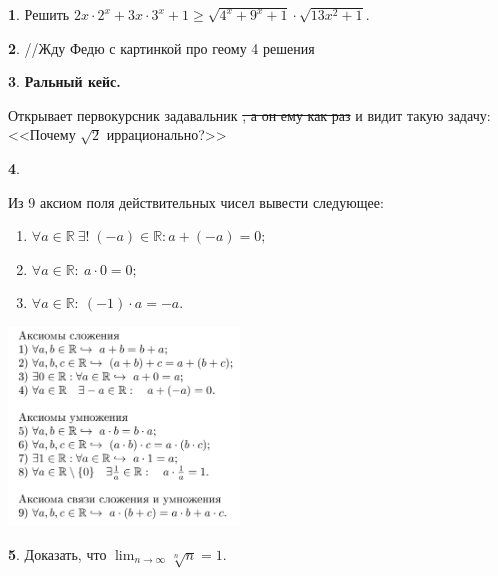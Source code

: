 \documentclass[14pt, a4paper]{extarticle}
\theoremstyle{definition}
\newtheorem{problem}{}
\theoremstyle{definition}
\theoremstyle{remark}
\numberwithin{equation}{section}
\newcommand{\R}{\ensuremath{\mathbb{R}}}
\begin{document}
\begin{problem}
    Решить $2x \cdot 2^x + 3x \cdot 3^x + 1 \geqslant 
    \sqrt{4^x + 9^x +1} \cdot \sqrt{13x^2 + 1}.$
\end{problem}

\begin{problem}
    //Жду Федю с картинкой про геому 4 решения
\end{problem}

\begin{problem}
    \textbf{Ральный кейс.}

    Открывает первокурсник задавальник \sout{, а он ему как раз}
    и видит такую задачу: <<Почему $\sqrt{2}$ иррационально?>>
\end{problem}

\begin{problem}
    \begin{multicols}{2}
        Из 9 аксиом поля действительных чисел вывести следующее:
        \renewcommand{\labelenumi}{\alph{enumi})}
        \begin{enumerate}
        \item $\forall a \in \R \ \exists ! \; (-a)\in \R : a + (-a) = 0;$
        
        \item $\forall a \in \R : \ a \cdot 0 = 0;$
        
        \item $\forall a \in \R : \ (-1) \cdot a = -a.$
        \end{enumerate}

        \columnbreak

        \includegraphics[width=0.46\textwidth]{ax.jpeg}
      \end{multicols}
\end{problem}

\begin{problem}
    Доказать, что $\displaystyle\lim_{n\to\infty}{\sqrt[n]{n}} = 1.$
\end{problem}
\end{document}
